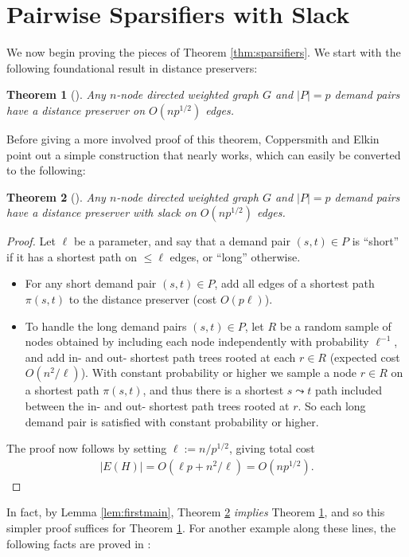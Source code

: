 \documentclass{article}
\newtheorem{theorem}{Theorem}
\begin{document}
\section{Pairwise Sparsifiers with Slack}

We now begin proving the pieces of Theorem \ref{thm:sparsifiers}.
We start with the following foundational result in distance preservers:
\begin{theorem} [\cite{CE06}] \label{thm:cedp}
Any $n$-node directed weighted graph $G$ and $|P|=p$ demand pairs have a distance preserver on $O(np^{1/2})$ edges.
\end{theorem}
Before giving a more involved proof of this theorem, Coppersmith and Elkin point out a simple construction that nearly works, which can easily be converted to the following:
\begin{theorem} [\cite{CE06}] \label{thm:cedpforeach}
Any $n$-node directed weighted graph $G$ and $|P|=p$ demand pairs have a distance preserver with slack on $O(np^{1/2})$ edges.
\end{theorem}
\begin{proof}
Let $\ell$ be a parameter, and say that a demand pair $(s, t) \in P$ is ``short'' if it has a shortest path on $\le \ell$ edges, or ``long'' otherwise.
\begin{itemize}
\item For any short demand pair $(s, t) \in P$, add all edges of a shortest path $\pi(s, t)$ to the distance preserver (cost $O(p \ell)$).

\item To handle the long demand pairs $(s, t) \in P$, let $R$ be a random sample of nodes obtained by including each node independently with probability $\ell^{-1}$, and add in- and out- shortest path trees rooted at each $r \in R$ (expected cost $O(n^2 / \ell)$).
With constant probability or higher we sample a node $r \in R$ on a shortest path $\pi(s, t)$, and thus there is a shortest $s \leadsto t$ path included between the in- and out- shortest path trees rooted at $r$.
So each long demand pair is satisfied with constant probability or higher.
\end{itemize}
The proof now follows by setting $\ell := n/p^{1/2}$, giving total cost
\begin{align*}
|E(H)| = O\left( \ell p + n^2 / \ell \right) = O\left( n p^{1/2} \right). \tag*{\qedhere}
\end{align*}
\end{proof}

In fact, by Lemma \ref{lem:firstmain}, Theorem \ref{thm:cedpforeach} \emph{implies} Theorem \ref{thm:cedp}, and so this simpler proof suffices for Theorem \ref{thm:cedp}.
For another example along these lines, the following facts are proved in \cite{AB18}:
\end{document}
